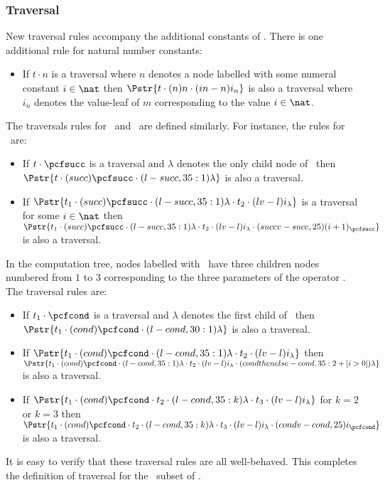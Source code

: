 \subsubsection{Traversal}

New traversal rules accompany the additional constants of \ialgol.
There is one additional rule for natural number constants:
\begin{itemize}
\item {} If $t \cdot n$ is a traversal where $n$ denotes a node labelled with some numeral constant $i\in \nat$ then
            $\Pstr{t \cdot (n){n} \cdot (in-n){i_n}}$
            is also a traversal where $i_n$ denotes the value-leaf of $m$ corresponding to the value $i\in \nat$.
\end{itemize}

\noindent The traversals rules for \pcfpred\ and \pcfsucc\ are
defined similarly. For instance, the rules for \pcfsucc\ are:
\begin{itemize}
\item {} If $t \cdot \pcfsucc$ is a traversal and $\lambda$ denotes the only child node of \pcfsucc\ then
$\Pstr{t \cdot (succ){\pcfsucc} \cdot (l-succ,35:1){\lambda}}$ is also a traversal.

\item {} If
$\Pstr{ t_1 \cdot (succ){\pcfsucc} \cdot (l-succ,35:1){\lambda} \cdot t_2
\cdot (lv-l){i_{\lambda}}} $ is a traversal for some
$i \in \nat$ then $\Pstr{t_1 \cdot (succ){\pcfsucc} \cdot
(l-succ,35:1){\lambda} \cdot t_2 \cdot (lv-l){i_{\lambda}} \cdot
(succv-succ,25){(i+1)_{\pcfsucc}}}$ is also a traversal.
\end{itemize}

\noindent In the computation tree, nodes labelled with \pcfcond\
have three children nodes numbered from $1$ to $3$ corresponding to
the three parameters of the operator \pcfcond. The traversal rules
are:
\begin{itemize}
\item {} If $t_1 \cdot \pcfcond$ is a traversal and $\lambda$ denotes the first child of \pcfcond\ then
$\Pstr{ t_1 \cdot (cond){{\pcfcond}} \cdot (l-cond,30:1){\lambda}}$
 is also a traversal.

\item {} If
$\Pstr{t_1 \cdot (cond){\pcfcond} \cdot (l-cond,35:1){\lambda} \cdot t_2
\cdot (lv-l){i_{\lambda}}} $
then $\Pstr{t_1 \cdot
(cond){\pcfcond} \cdot (l-cond,35:1){\lambda} \cdot t_2 \cdot
(lv-l){i_{\lambda}} \cdot (condthenelse-cond,35:{2+[i>0]}){\lambda} }
$
is also a traversal. 



\item {} If
$\Pstr{t_1 \cdot (cond){\pcfcond} \cdot t_2 \cdot (l-cond,35:k){\lambda}
\cdot t_3 \cdot (lv-l){i_{\lambda}}}$
 for $k=2$ or $k=3$ then  $\Pstr{ t_1 \cdot
(cond){\pcfcond} \cdot t_2 \cdot (l-cond,35:k){\lambda} \cdot t_3
\cdot (lv-l){i_{\lambda}} \cdot (condv-cond,25){i_{\pcfcond}}}$
 is also a traversal.
\end{itemize}
It is easy to verify that these traversal rules are all
well-behaved. This completes the definition of traversal for the
\pcf\ subset of \ialgol.

